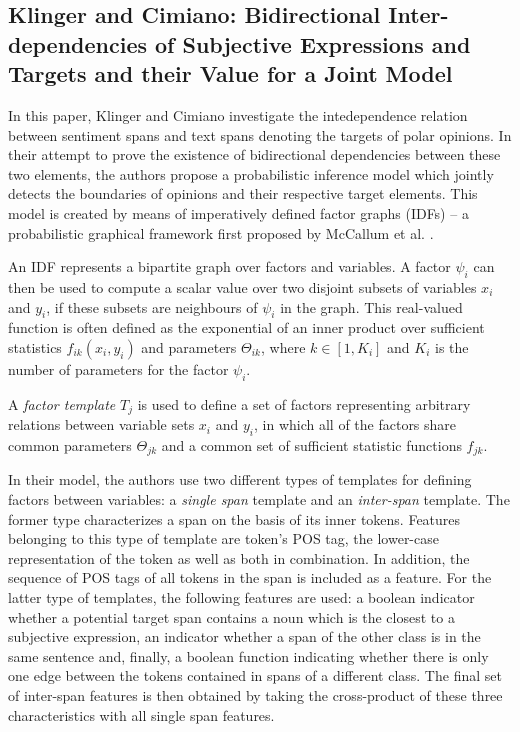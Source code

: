 \documentclass[a4paper,11pt]{article}
\begin{document}
\subsection{Klinger and Cimiano: Bidirectional Inter-dependencies of Subjective
  Expressions and Targets and their Value for a Joint Model \cite{Klinger-13}}

In this paper, Klinger and Cimiano investigate the intedependence relation
between sentiment spans and text spans denoting the targets of polar opinions.
In their attempt to prove the existence of bidirectional dependencies between
these two elements, the authors propose a probabilistic inference model which
jointly detects the boundaries of opinions and their respective target
elements.  This model is created by means of imperatively defined factor
graphs (IDFs) -- a probabilistic graphical framework first proposed by
McCallum et al. \cite{McCallum-09}.

An IDF represents a bipartite graph over factors and variables.  A factor
$\psi_i$ can then be used to compute a scalar value over two disjoint subsets
of variables $x_i$ and $y_i$, if these subsets are neighbours of $\psi_i$ in
the graph.  This real-valued function is often defined as the exponential of
an inner product over sufficient statistics ${f_{ik}(x_i, y_i)}$ and
parameters ${\Theta_{ik}}$, where $k \in [1, K_i]$ and $K_i$ is the number of
parameters for the factor $\psi_i$.

A \emph{factor template} $T_j$ is used to define a set of factors representing
arbitrary relations between variable sets $x_i$ and $y_i$, in which all of the
factors share common parameters $\Theta_{jk}$ and a common set of sufficient
statistic functions ${f_{jk}}$.

In their model, the authors use two different types of templates for defining
factors between variables: a \emph{single span} template and an
\emph{inter-span} template.  The former type characterizes a span on the basis
of its inner tokens.  Features belonging to this type of template are token's
POS tag, the lower-case representation of the token as well as both in
combination.  In addition, the sequence of POS tags of all tokens in the span
is included as a feature.  For the latter type of templates, the following
features are used: a boolean indicator whether a potential target span
contains a noun which is the closest to a subjective expression, an indicator
whether a span of the other class is in the same sentence and, finally, a
boolean function indicating whether there is only one edge between the tokens
contained in spans of a different class.  The final set of inter-span features
is then obtained by taking the cross-product of these three characteristics
with all single span features.
\end{document}

